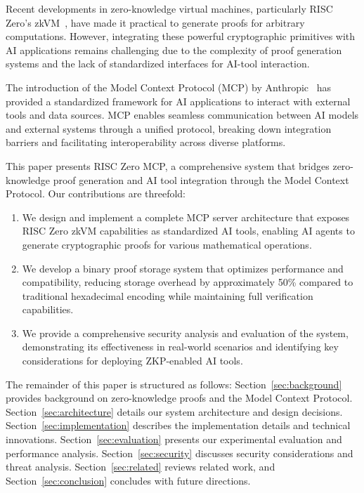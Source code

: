 \documentclass[11pt]{article}
\begin{document}
Recent developments in zero-knowledge virtual machines, particularly RISC Zero's zkVM~\cite{risc0whitepaper}, have made it practical to generate proofs for arbitrary computations. However, integrating these powerful cryptographic primitives with AI applications remains challenging due to the complexity of proof generation systems and the lack of standardized interfaces for AI-tool interaction.

The introduction of the Model Context Protocol (MCP) by Anthropic~\cite{anthropic2024mcp} has provided a standardized framework for AI applications to interact with external tools and data sources. MCP enables seamless communication between AI models and external systems through a unified protocol, breaking down integration barriers and facilitating interoperability across diverse platforms.

This paper presents RISC Zero MCP, a comprehensive system that bridges zero-knowledge proof generation and AI tool integration through the Model Context Protocol. Our contributions are threefold:

\begin{enumerate}
\item We design and implement a complete MCP server architecture that exposes RISC Zero zkVM capabilities as standardized AI tools, enabling AI agents to generate cryptographic proofs for various mathematical operations.

\item We develop a binary proof storage system that optimizes performance and compatibility, reducing storage overhead by approximately 50\% compared to traditional hexadecimal encoding while maintaining full verification capabilities.

\item We provide a comprehensive security analysis and evaluation of the system, demonstrating its effectiveness in real-world scenarios and identifying key considerations for deploying ZKP-enabled AI tools.
\end{enumerate}

The remainder of this paper is structured as follows: Section~\ref{sec:background} provides background on zero-knowledge proofs and the Model Context Protocol. Section~\ref{sec:architecture} details our system architecture and design decisions. Section~\ref{sec:implementation} describes the implementation details and technical innovations. Section~\ref{sec:evaluation} presents our experimental evaluation and performance analysis. Section~\ref{sec:security} discusses security considerations and threat analysis. Section~\ref{sec:related} reviews related work, and Section~\ref{sec:conclusion} concludes with future directions.
\end{document}
